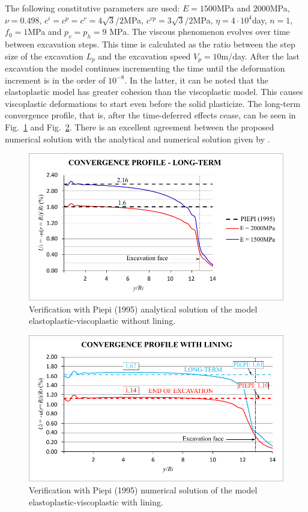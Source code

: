 \documentclass[Journal,letterpaper]{ascelike-new}
\begin{document}
The following constitutive parameters are used: $E=1500$MPa and $2000$MPa, $\nu=0.498$, $c^i=c^p=c^r =4\sqrt{3}/2$MPa, $ c^{vp}=3\sqrt{3}/2$MPa, $\eta = 4 \cdot 10^4$day, $n=1$, $f_0=1$MPa and $p_v=p_h=9$ MPa. The viscous phenomenon evolves over time between excavation steps. This time is calculated as the ratio between the step size of the excavation $L_p$ and the excavation speed $V_p = 10$m/day. After the last excavation the model continues incrementing the time until the deformation increment is in the order of $10^{-8}$. In the latter, it can be noted that the elastoplastic model has greater cohesion than the viscoplastic model. This causes viscoplastic deformations to start even before the solid plasticize. The long-term convergence profile, that is, after the time-deferred effects cease, can be seen in Fig.~\ref{convergence_profile_piepi} and Fig.~\ref{convergence_profile_piepi_with_lining}. There is an excellent agreement between the proposed numerical solution with the analytical and numerical solution given by .

\begin{figure}
	\centering
	\includegraphics[scale = 1.0]{FIG5.pdf}
	\caption{\label{convergence_profile_piepi}Verification with Piepi (1995) analytical solution of the model elastoplastic-viscoplastic without lining.}
\end{figure}

\begin{figure}
	\centering
	\includegraphics[scale = 1.0]{FIG6.pdf}
	\caption{\label{convergence_profile_piepi_with_lining}Verification with Piepi (1995) numerical solution of the model elastoplastic-viscoplastic with lining.}
\end{figure}
\end{document}
